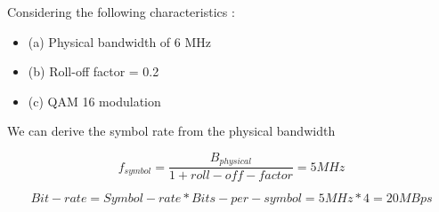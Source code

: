 Considering the following characteristics :

    \begin{itemize}
        \item (a) Physical bandwidth of 6 MHz
        \item (b) Roll-off factor = 0.2 
        \item (c) QAM 16 modulation 
    \end{itemize}

We can derive the symbol rate from the physical bandwidth

\begin{equation*}
    f_{symbol} = \frac{B_{physical}}{1+roll-off-factor} = 5 MHz
\end{equation*}

\begin{equation*}
    Bit-rate = Symbol-rate * Bits-per-symbol = 5MHz*4 = 20 MBps
\end{equation*}

